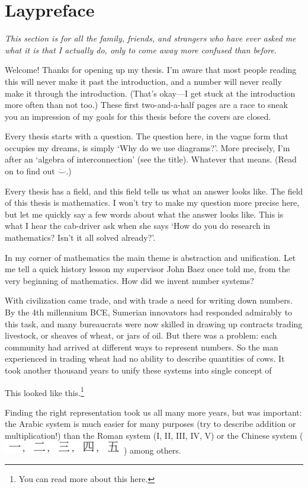 {}
\chapter*{Laypreface}

\textit{This section is for all the family, friends, and strangers who have ever
asked me what it is that I actually do, only to come away more confused than
before.}

Welcome! Thanks for opening up my thesis. I'm aware that most people reading
this will never make it past the introduction, and a number will never really
make it through the introduction. (That's okay---I get stuck at the introduction
more often than not too.) These first two-and-a-half pages are a race to sneak
you an impression of my goals for this thesis before the covers are closed. 

Every thesis starts with a question. The question here, in the vague form that
occupies my dreams, is simply `Why do we use diagrams?'. More precisely, I'm
after an `algebra of interconnection' (see the title). Whatever that means.
(Read on to find out $\ddot\smile$.)

Every thesis has a field, and this field tells us what an answer looks like. The
field of this thesis is mathematics. I won't try to make my question more
precise here, but let me quickly say a few words about what the answer looks
like. This is what I hear the cab-driver ask when she says `How do you do
research in mathematics? Isn't it all solved already?'.

In my corner of mathematics the main theme is abstraction and unification. Let
me tell a quick history lesson my supervisor John Baez once told me, from the
very beginning of mathematics. How did we invent number systems?

With civilization came trade, and with trade a need for writing down numbers.
By the 4th millennium BCE, Sumerian innovators had responded admirably to this
task, and many bureaucrats were now skilled in drawing up contracts trading
livestock, or sheaves of wheat, or jars of oil. But there was a problem: each
community had arrived at different ways to represent numbers. So the man
experienced in trading wheat had no ability to describe quantities of cows. It
took another thousand years to unify these systems into single concept of 

This looked like this.\footnote{You can read more about this here.}

Finding the right representation took us all many more years, but was important:
the Arabic system is much easier for many purposes (try to describe addition or
multiplication!) than the Roman system (I, II, III, IV, V) or the Chinese system
(\includegraphics{pics/chinesenumerals}) among others.

